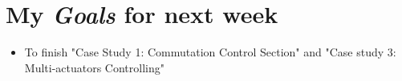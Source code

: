 \section{My \emph{Goals} for next week}

\begin{itemize}
\item To finish "Case Study 1: Commutation Control Section" and "Case study 3: Multi-actuators Controlling"
\end{itemize}










